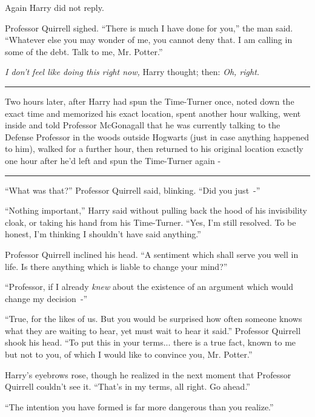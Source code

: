 Again Harry did not reply.

Professor Quirrell sighed. ``There is much I have done for you,'' the man said. ``Whatever else you may wonder of me, you cannot deny that. I am calling in some of the debt. Talk to me, Mr. Potter.''

\emph{I don't feel like doing this right now,} Harry thought; then: \emph{Oh, right.}

\begin{center}\rule{3in}{0.4pt}\end{center}

Two hours later, after Harry had spun the Time-Turner once, noted down the exact time and memorized his exact location, spent another hour walking, went inside and told Professor McGonagall that he was currently talking to the Defense Professor in the woods outside Hogwarts (just in case anything happened to him), walked for a further hour, then returned to his original location exactly one hour after he'd left and spun the Time-Turner again -

\begin{center}\rule{3in}{0.4pt}\end{center}

``What was that?'' Professor Quirrell said, blinking. ``Did you just~-''

``Nothing important,'' Harry said without pulling back the hood of his invisibility cloak, or taking his hand from his Time-Turner. ``Yes, I'm still resolved. To be honest, I'm thinking I shouldn't have said anything.''

Professor Quirrell inclined his head. ``A sentiment which shall serve you well in life. Is there anything which is liable to change your mind?''

``Professor, if I already \emph{knew} about the existence of an argument which would change my decision~-''

``True, for the likes of us. But you would be surprised how often someone knows what they are waiting to hear, yet must wait to hear it said.'' Professor Quirrell shook his head. ``To put this in your terms... there is a true fact, known to me but not to you, of which I would like to convince you, Mr. Potter.''

Harry's eyebrows rose, though he realized in the next moment that Professor Quirrell couldn't see it. ``That's in my terms, all right. Go ahead.''

``The intention you have formed is far more dangerous than you realize.''

